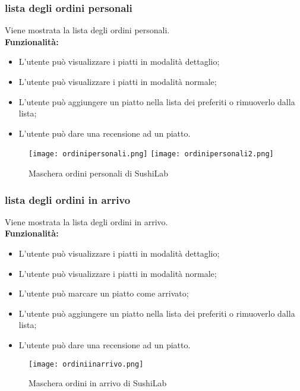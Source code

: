 \subsubsection{lista degli ordini personali}
Viene mostrata la lista degli ordini personali.\\
\textbf{Funzionalità:}
\begin{itemize}
    \item L'utente può visualizzare i piatti in modalità dettaglio;
    \item L'utente può visualizzare i piatti in modalità normale;
    \item L'utente può aggiungere un piatto nella lista dei preferiti o rimuoverlo dalla lista;
    \item L'utente può dare una recensione ad un piatto.
\end{itemize}
\begin{figure}[H]
    \centering
    \texttt{[image: ordinipersonali.png]}
    \texttt{[image: ordinipersonali2.png]}
    \caption{Maschera ordini personali di SushiLab}
\end{figure}


\subsubsection{lista degli ordini in arrivo}
Viene mostrata la lista degli ordini in arrivo.\\
\textbf{Funzionalità:}
\begin{itemize}
    \item L'utente può visualizzare i piatti in modalità dettaglio;
    \item L'utente può visualizzare i piatti in modalità normale;
    \item L'utente può marcare un piatto come arrivato;
    \item L'utente può aggiungere un piatto nella lista dei preferiti o rimuoverlo dalla lista;
    \item L'utente può dare una recensione ad un piatto.
\end{itemize}
\begin{figure}[H]
    \centering
    \texttt{[image: ordiniinarrivo.png]}
    \caption{Maschera ordini in arrivo di SushiLab}
\end{figure}


